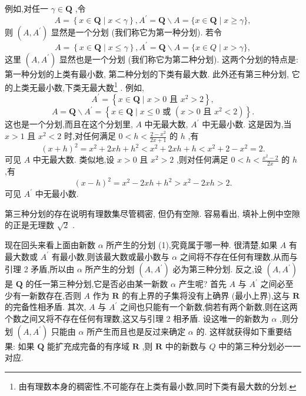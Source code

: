 例如,对任一 \(\gamma  \in  \mathbf{Q}\) ,令
\[
A = \left\{  {x \in  \mathbf{Q} \mid  x < \gamma }\right\}  ,{A}^{\prime } = \mathbf{Q} \smallsetminus  A = \{ x \in  \mathbf{Q} \mid  x \geq  \gamma \} ,
\]
则 \(\left( {A,{A}^{\prime }}\right)\) 显然是一个分划 (我们称它为第一种分划). 若令
\[
A = \left\{  {x \in  \mathbf{Q} \mid  x \leq  \gamma }\right\}  ,{A}^{\prime } = \mathbf{Q} \smallsetminus  A = \{ x \in  Q \mid  x > \gamma \} ,
\]
这里 \(\left( {A,{A}^{\prime }}\right)\) 显然也是一个分划 (我们称它为第二种分划). 这两个分划的特点是: 第一种分划的上类有最小数, 第二种分划的下类有最大数. 此外还有第三种分划, 它的上类无最小数,下类无最大数\footnote{由有理数本身的稠密性,不可能存在上类有最小数,同时下类有最大数的分划.} . 例如,
\[
{A}^{\prime } = \left\{  {x \in  \mathbf{Q} \mid  x > 0\text{ 且 }{x}^{2} > 2}\right\}  ,
\]
\[
A = \mathbf{Q} \smallsetminus  {A}^{\prime } = \left\{  {x \in  \mathbf{Q} \mid  x \leq  0\text{ 或 }\left( {x > 0\text{ 且 }{x}^{2} < 2}\right) }\right\}  .
\]
这也是一个分划,而且在这个分划里, \(A\) 中无最大数, \({A}^{\prime }\) 中无最小数. 这是因为,当 \(x > 1\) 且 \({x}^{2} < 2\) 时,对任何满足 \(0 < h < \frac{2 - {x}^{2}}{{2x} + 1}\) 的 \(h\) ,有
\[
{\left( x + h\right) }^{2} = {x}^{2} + {2xh} + {h}^{2} < {x}^{2} + {2xh} + h < {x}^{2} + 2 - {x}^{2} = 2.
\]
可见 \(A\) 中无最大数. 类似地,设 \(x > 0\) 且 \({x}^{2} > 2\) ,则对任何满足 \(0 < h < \frac{{x}^{2} - 2}{2x}\) 的 \(h\) ,有
\[
{\left( x - h\right) }^{2} = {x}^{2} - {2xh} + {h}^{2} > {x}^{2} - {2xh} > 2.
\]
可见 \({A}^{\prime }\) 中无最小数.

第三种分划的存在说明有理数集尽管稠密, 但仍有空隙. 容易看出, 填补上例中空隙的正是无理数 \(\sqrt{2}\) .

现在回头来看上面由新数 \(\alpha\) 所产生的分划 (1),究竟属于哪一种. 很清楚,如果 \(A\) 有最大数或 \({A}^{\prime }\) 有最小数,则该最大数或最小数与 \(\alpha\) 之间将不存在任何有理数,从而与引理 2 矛盾,所以由 \(\alpha\) 所产生的分划 \(\left( {A,{A}^{\prime }}\right)\) 必为第三种分划. 反之,设 \(\left( {A,{A}^{\prime }}\right)\) 是 \(\mathbf{Q}\) 的任一第三种分划,它是否必由某一新数 \(\alpha\) 产生呢? 首先 \(A\) 与 \({A}^{\prime }\) 之间必至少有一新数存在,否则 \(A\) 作为 \(\mathbf{R}\) 的有上界的子集将没有上确界 (最小上界),这与 \(\mathbf{R}\) 的完备性相矛盾. 其次, \(A\) 与 \({A}^{\prime }\) 之间也只能有一个新数,倘若有两个新数,则在这两个数之间又将不存在任何有理数,这又与引理 2 相矛盾. 设这唯一的新数为 \(\alpha\) ,则分划 \(\left( {A,{A}^{\prime }}\right)\) 只能由 \(\alpha\) 所产生而且也是反过来确定 \(\alpha\) 的. 这样就获得如下重要结果: 如果 \(\mathbf{Q}\) 能扩充成完备的有序域 \(\mathbf{R}\) ,则 \(\mathbf{R}\) 中的新数与 \(Q\) 中的第三种分划必一一对应.

